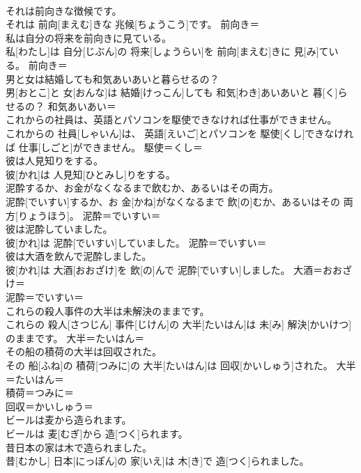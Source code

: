 \documentclass[8pt]{extreport}
\begin{document}
\begin{CJK}{UTF8}{min}
\\	それは前向きな徴候です。	
\\	それは 前向[まえむ]きな 兆候[ちょうこう]です。	前向き＝ 
\\	私は自分の将来を前向きに見ている。	
\\	私[わたし]は 自分[じぶん]の 将来[しょうらい]を 前向[まえむ]きに 見[み]ている。	前向き＝ 
\\	男と女は結婚しても和気あいあいと暮らせるの？	
\\	男[おとこ]と 女[おんな]は 結婚[けっこん]しても 和気[わき]あいあいと 暮[く]らせるの？	和気あいあい＝ 
\\	これからの社員は、英語とパソコンを駆使できなければ仕事ができません。	
\\	これからの 社員[しゃいん]は、 英語[えいご]とパソコンを 駆使[くし]できなければ 仕事[しごと]ができません。	駆使＝くし＝ 
\\	彼は人見知りをする。	
\\	彼[かれ]は 人見知[ひとみし]りをする。	
\\	泥酔するか、お金がなくなるまで飲むか、あるいはその両方。	
\\	泥酔[でいすい]するか、お 金[かね]がなくなるまで 飲[の]むか、あるいはその 両方[りょうほう]。	泥酔＝でいすい＝ 
\\	彼は泥酔していました。	
\\	彼[かれ]は 泥酔[でいすい]していました。	泥酔＝でいすい＝ 
\\	彼は大酒を飲んで泥酔しました。	
\\	彼[かれ]は 大酒[おおざけ]を 飲[の]んで 泥酔[でいすい]しました。	大酒＝おおざけ＝ 
\\	泥酔＝でいすい＝ 
\\	これらの殺人事件の大半は未解決のままです。	
\\	これらの 殺人[さつじん] 事件[じけん]の 大半[たいはん]は 未[み] 解決[かいけつ]のままです。	大半＝たいはん＝ 
\\	その船の積荷の大半は回収された。	
\\	その 船[ふね]の 積荷[つみに]の 大半[たいはん]は 回収[かいしゅう]された。	大半＝たいはん＝ 
\\	積荷＝つみに＝ 
\\	回収＝かいしゅう＝ 
\\	ビールは麦から造られます。	
\\	ビールは 麦[むぎ]から 造[つく]られます。	
\\	昔日本の家は木で造られました。	
\\	昔[むかし] 日本[にっぽん]の 家[いえ]は 木[き]で 造[つく]られました。	

\end{CJK}
\end{document}
